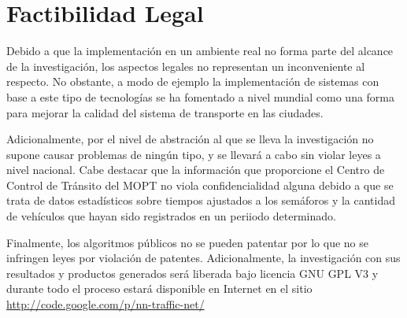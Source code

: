 	\section{Factibilidad Legal}
	
		Debido a que la implementaci\'{o}n en un ambiente real no forma parte del
		alcance de la investigaci\'{o}n, los aspectos legales no representan un inconveniente al
respecto. No obstante, a modo de ejemplo la implementaci\'{o}n de sistemas con
base a este tipo de tecnolog\'{i}as se ha fomentado a nivel mundial como una
forma para mejorar la calidad del sistema de transporte en las ciudades.
	
	Adicionalmente, por el nivel de abstraci\'{o}n al que se lleva la
investigaci\'{o}n no supone causar problemas de ning\'{u}n tipo, y se
llevar\'{a} a cabo sin violar leyes a nivel nacional. Cabe destacar que la
informaci\'{o}n que proporcione el Centro de Control de Tr\'{a}nsito del MOPT no
viola confidencialidad alguna debido a que se trata de datos estad\'{i}sticos sobre tiempos ajustados a los
sem\'{a}foros y la cantidad de veh\'{i}culos que hayan sido registrados en un
periiodo determinado.
	
	Finalmente, los algoritmos p\'{u}blicos no se pueden patentar por lo que no se
	infringen leyes por violaci\'{o}n de patentes. Adicionalmente, la
	investigaci\'{o}n con sus resultados y productos generados ser\'{a} liberada bajo licencia GNU GPL V3 y durante todo el proceso estar\'{a} disponible en Internet en el sitio
\url{http://code.google.com/p/nn-traffic-net/}

